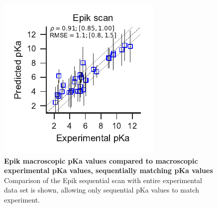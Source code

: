 \documentclass[9pt,lineno,final]{elife}
\begin{document}
\begin{figure}[H]
\end{figure}
    

\begin{figure}[H]
	\centering
	\includegraphics[scale=1.0]{aligned_pka_epik_scan.pdf}	
	\caption{{\bf Epik macroscopic pKa values compared to macroscopic experimental pKa values, sequentially matching pKa values}
		Comparison of the Epik sequential scan with entire experimental data set is shown, allowing only sequential pKa values to match experiment.\label{fig:correlation-sequential}}
\end{figure}
    
\end{document}
